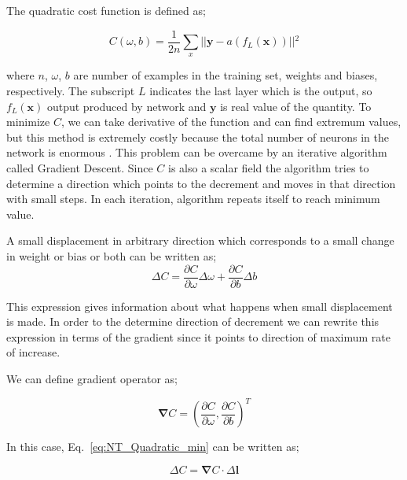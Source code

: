 \documentclass[a4paper,times,12pt]{article}
\begin{document}
The quadratic cost function is defined as;

\begin{equation}
\label{eq:NT_Quadratic}
C(\omega, b) = \frac{1}{2n} \sum\limits_{x} || \boldsymbol{y} - a(f_L(\boldsymbol{x})) ||{^2} 
\end{equation}

\noindent where $n$, $\omega$, $b$ are number of examples in the training set, weights and biases, respectively. The subscript $L$ indicates the last layer which is the output, so $f_L(\boldsymbol{x})$ output produced by network and $\boldsymbol{y}$ is real value of the quantity. To minimize $C$, we can take derivative of the function and can find extremum values, but this method is extremely costly because the total number of neurons in the network is enormous \cite{nielsen2015neural}. This problem can be overcame by an iterative algorithm called Gradient Descent. Since $C$ is also a scalar field the algorithm tries to determine a direction which points to the decrement and moves in that direction with small steps. In each iteration, algorithm repeats itself to reach minimum value. 

A small displacement in arbitrary direction which corresponds to a small change in weight or bias or both can be written as;
\begin{equation}
\label{eq:NT_Quadratic_min}
\Delta{C} = \frac{\partial{C}}{\partial{\omega}}\Delta{\omega} + \frac{\partial{C}}{\partial{b}}\Delta{b}
\end{equation}

\noindent This expression gives information about what happens when small displacement is made. In order to the determine direction of decrement we can rewrite this expression in terms of the gradient since it points to direction of maximum rate of increase. 

We can define gradient operator as;

\begin{equation}
\label{eq:gradient}
\boldsymbol{\nabla}{C} = \left(\frac{\partial{C}}{\partial{\omega}},\frac{\partial{C}}{\partial{b}} \right)^T
\end{equation}

\noindent In this case, Eq.~\eqref{eq:NT_Quadratic_min} can be written as;

\begin{equation}
\label{eq:NT_Quadratic_min_gradient_form}
\Delta{C} = \boldsymbol{\nabla}{C} \cdot \Delta \boldsymbol{l}
\end{equation}
\end{document}
